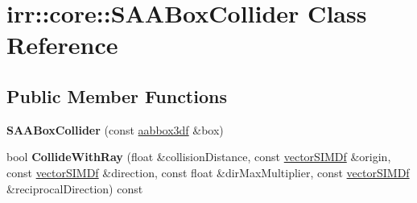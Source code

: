 \hypertarget{classirr_1_1core_1_1SAABoxCollider}{}\section{irr\+:\+:core\+:\+:S\+A\+A\+Box\+Collider Class Reference}
\label{classirr_1_1core_1_1SAABoxCollider}
\subsection*{Public Member Functions}
\begin{DoxyCompactItemize}
\item 
{\bfseries S\+A\+A\+Box\+Collider} (const \hyperlink{namespaceirr_1_1core_adfc8fa01b30044c55f3332a1d6c1aa19}{aabbox3df} \&box)\hypertarget{classirr_1_1core_1_1SAABoxCollider_a101c62dbb3688f2daf85da91647a02d9}{}\label{classirr_1_1core_1_1SAABoxCollider_a101c62dbb3688f2daf85da91647a02d9}

\item 
bool {\bfseries Collide\+With\+Ray} (float \&collision\+Distance, const \hyperlink{classirr_1_1core_1_1vectorSIMDf}{vector\+S\+I\+M\+Df} \&origin, const \hyperlink{classirr_1_1core_1_1vectorSIMDf}{vector\+S\+I\+M\+Df} \&direction, const float \&dir\+Max\+Multiplier, const \hyperlink{classirr_1_1core_1_1vectorSIMDf}{vector\+S\+I\+M\+Df} \&reciprocal\+Direction) const \hypertarget{classirr_1_1core_1_1SAABoxCollider_a580f6c538deb6dbc86fcd6344bc45f87}{}\label{classirr_1_1core_1_1SAABoxCollider_a580f6c538deb6dbc86fcd6344bc45f87}

\end{DoxyCompactItemize}
